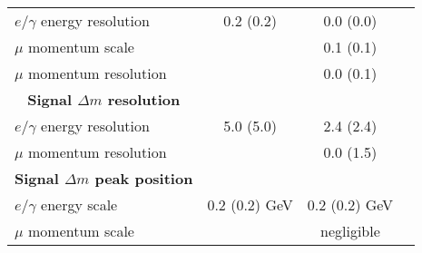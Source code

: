 \begin{table}[!htbp]
\begin{tabular}{cccc}
       \multicolumn{1}{l}{$e/\gamma$ energy resolution}               & 0.2 (0.2)                        & 0.0 (0.0)          \\
       \multicolumn{1}{l}{$\mu$ momentum scale}                       &                                  & 0.1 (0.1)          \\  
       \multicolumn{1}{l}{$\mu$ momentum resolution}                  &                                  & 0.0 (0.1)          \\
       \hline
       \textbf{Signal $\Delta m$ resolution}      &                                    &                                      \\  
       \hline 
       \multicolumn{1}{l}{$e/\gamma$ energy resolution}               & 5.0 (5.0)                        & 2.4 (2.4)          \\ 
       \multicolumn{1}{l}{$\mu$ momentum resolution}                  &                                  & 0.0 (1.5)          \\
       \hline
       \textbf{Signal $\Delta m$ peak position} \\
       \hline
       \multicolumn{1}{l}{$e/\gamma$ energy scale}                    & 0.2 (0.2) GeV                    & 0.2 (0.2) GeV    \\
       \multicolumn{1}{l}{$\mu$ momentum scale}                       &                                  & negligible         \\
       \hline
       \hline
 \end{tabular}
\end{table}
